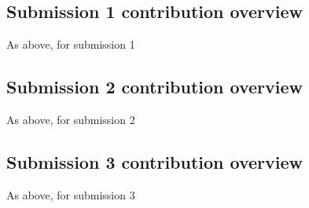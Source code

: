 \documentclass[a4paper, 11pt]{report}
\begin{document}
\subsection{Submission 1 contribution overview}

As above, for submission 1

\subsection{Submission 2 contribution overview}

As above, for submission 2

\subsection{Submission 3 contribution overview}

As above, for submission 3



\newpage



\end{document}
